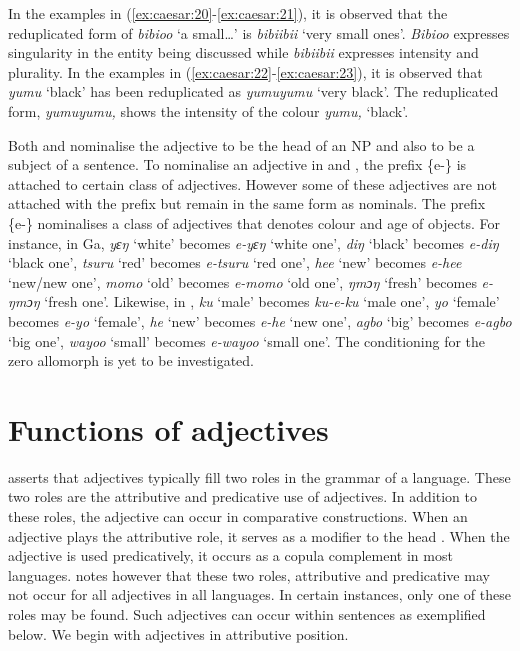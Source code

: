 \documentclass[output=paper,
modfonts
]{langscibook}
\begin{document}
In the  examples in (\ref{ex:caesar:20}-\ref{ex:caesar:21}), it is observed that the reduplicated form of \textit{bibioo} ‘a small…’ is \textit{bibiibii} ‘very small ones’. \textit{Bibioo} expresses singularity in the entity being discussed while \textit{bibiibii} expresses intensity and plurality. In the  examples in (\ref{ex:caesar:22}-\ref{ex:caesar:23}), it is observed that \textit{yumu} ‘black’ has been reduplicated as \textit{yumuyumu} ‘very black’. The reduplicated form, \textit{yumuyumu,} shows the intensity of the colour \textit{yumu,} ‘black’.



Both  and  nominalise the adjective to be the head of an NP and also to be a subject of a sentence. To nominalise an adjective in  and , the prefix \{e-\} is attached to certain class of adjectives. However some of these adjectives are not attached with the prefix but remain in the same form as nominals. The prefix \{e-\} nominalises a class of adjectives that denotes colour and age of objects. For instance, in Ga, \textit{yɛŋ} `white' becomes \textit{e-yɛŋ} ‘white one’, \textit{diŋ} `black' becomes \textit{e-diŋ} ‘black one’, \textit{tsuru} `red' becomes \textit{e-tsuru} ‘red one’, \textit{hee} `new' becomes \textit{e-hee} ‘new/new one’, \textit{momo} `old' becomes \textit{e-momo} ‘old one’, \textit{ŋmↄŋ} ‘fresh’ becomes \textit{e-ŋmↄŋ} ‘fresh one’. Likewise, in , \textit{ku} ‘male’ becomes \textit{ku-e-ku} ‘male one’, \textit{yo} ‘female’ becomes \textit{e-yo} ‘female’, \textit{he} ‘new' becomes \textit{e-he} ‘new one', \textit{agbo} ‘big’ becomes \textit{e-agbo} ‘big one’, \textit{wayoo} ‘small’ becomes \textit{e-wayoo} ‘small one’. The conditioning for the zero allomorph is yet to be investigated. 

\section{Functions of adjectives}\label{sec:caesar:3} 

\citet{Dixon2004} asserts that adjectives typically fill two roles in the grammar of a language. These two roles are the attributive and predicative use of adjectives. In addition to these roles, the adjective can occur in comparative constructions. When an adjective plays the attributive role, it serves as a modifier to the head . When the adjective is used predicatively, it occurs as a copula complement in most languages. \citet{Dixon2004} notes however that these two roles, attributive and predicative may not occur for all adjectives in all languages. In certain instances, only one of these roles may be found. Such adjectives can occur within sentences as exemplified below. We begin with adjectives in attributive position.
\end{document}
